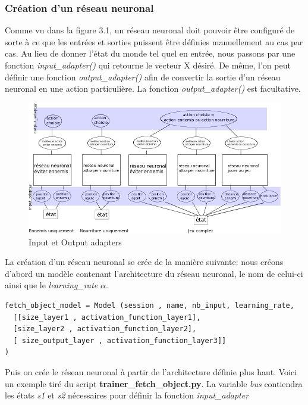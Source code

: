 \documentclass[11pt,a4paper]{report}
\begin{document}
 \subsubsection{Création d'un réseau neuronal} 
 
 \par Comme vu dans la figure 3.1, un réseau neuronal doit pouvoir être configuré de sorte à ce que les entrées et sorties puissent être définies manuellement au cas par cas. Au lieu de donner l'état du monde tel quel en entrée, nous passons par une fonction \textit{input\_adapter()} qui retourne le vecteur X désiré. De même, l'on peut définir une fonction \textit{output\_adapter()} afin de convertir la sortie d'un réseau neuronal en une action particulière. La fonction \textit{output\_adapter()} est facultative. 
 
  \begin{figure}[!h]
  \center
  \includegraphics[scale=0.6]{ressources/input_output_adapters.png}
  \caption{Input et Output adapters}
  \end{figure} 

  \par La création d'un réseau neuronal se crée de la manière suivante: nous créons d'abord un modèle contenant l'architecture du réseau neuronal, le nom de celui-ci ainsi que le \textit{learning\_rate} $\alpha$. 
  
 \begin{lstlisting}[language=python]
fetch_object_model = Model (session , name, nb_input, learning_rate,
  [[size_layer1 , activation_function_layer1],
  [size_layer2 , activation_function_layer2],
  [ size_output_layer , activation_function_layer3]]
)
  \end{lstlisting}  
  
  \par Puis on crée le réseau neuronal à partir de l'architecture définie plus haut. Voici un exemple tiré du script \textbf{trainer\_fetch\_object.py}. La variable \textit{bus} contiendra les états \textit{s1} et \textit{s2} nécessaires pour définir la fonction \textit{input\_adapter}
  
\end{document}
